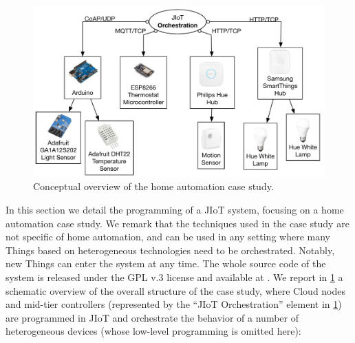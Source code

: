\begin{figure}[t]
  \centering
  \includegraphics[width=\textwidth]{case_study_overview.pdf}
  \caption{Conceptual overview of the home automation case study.}
  \label{fig:case_study_overview} \end{figure}

In this section we detail the programming of a JIoT system, focusing on a home
automation case study. We remark that the techniques used in the case study
are not specific of home automation, and can be used in any setting where many
Things based on heterogeneous technologies need to be orchestrated. Notably,
new Things can enter the system at any time. The whole source code of the
system is released under the GPL v.3
license and available at \cite{jiot}. We
report in \cref{fig:case_study_overview} a schematic overview of the overall
structure of the case study, where Cloud nodes and mid-tier controllers
(represented by the ``JIoT Orchestration'' element in
\cref{fig:case_study_overview}) are programmed in JIoT and orchestrate the
behavior of a number of heterogeneous devices (whose low-level programming is
omitted here): 

